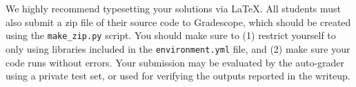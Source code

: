 We highly recommend typesetting your solutions via \LaTeX. %
All students must also submit a zip file of
their source code to Gradescope, which should be created using the
\texttt{make\_zip.py} script. You
should make sure to (1) restrict yourself to only using libraries included in
the
\texttt{environment.yml} file, and (2) make sure your code runs without errors.
Your submission may be evaluated by the
auto-grader using a private test set, or used for verifying the outputs reported in the writeup. 


